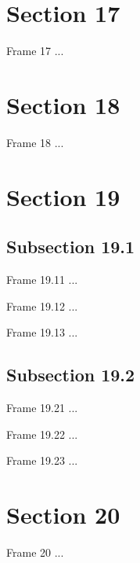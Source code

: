 \documentclass{beamer}
\begin{document}
\section{Section 17}
\begin{frame}{Frame 17}
...
\end{frame}

\section{Section 18}
\begin{frame}{Frame 18}
...
\end{frame}

\section{Section 19}
\subsection{Subsection 19.1}
\begin{frame}{Frame 19.11}
...
\end{frame}
\begin{frame}{Frame 19.12}
...
\end{frame}
\begin{frame}{Frame 19.13}
...
\end{frame}
\subsection{Subsection 19.2}
\begin{frame}{Frame 19.21}
...
\end{frame}
\begin{frame}{Frame 19.22}
...
\end{frame}
\begin{frame}{Frame 19.23}
...
\end{frame}

\section{Section 20}
\begin{frame}{Frame 20}
...
\end{frame}
\end{document}
